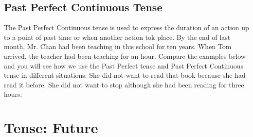 \subsection{Past Perfect Continuous Tense}
The Past Perfect Continuous tense is used to express the duration of an action
up to a point of past time or when another action tok place.
\newline
By the end of last month, Mr. Chan had been teaching in this school for ten
years.
\newline
When Tom arrived, the teacher had been teaching for an hour.
\newline
\newline
Compare the examples below and you will see how we use the Past Perfect tense
and Past Perfect Continuous tense in different situations:
\newline
\newline
She did not want to read that book because she had read it before.
\newline
She did not want to stop although she had been reading for three hours.

\newpage
\section{Tense: Future}
